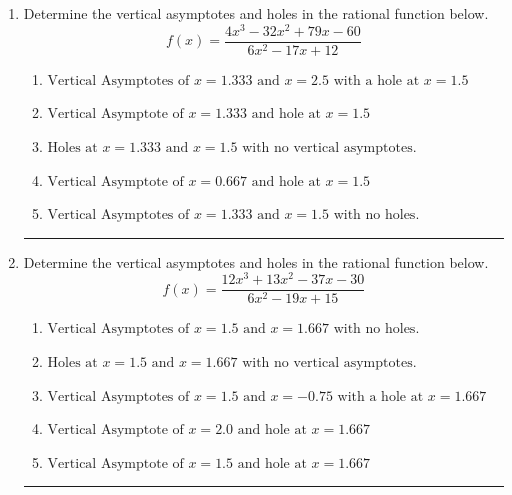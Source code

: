 \documentclass[14pt]{extbook}
\newcommand{\litem}[1]{\item#1\hspace*{-1cm}\rule{\textwidth}{0.4pt}}
\begin{document}
\begin{enumerate}
{\begin{enumerate}[label=\Alph*.]
\end{enumerate} }
\litem{
Determine the vertical asymptotes and holes in the rational function below.\[ f(x) = \frac{4x^{3} -32 x^{2} +79 x -60}{6x^{2} -17 x + 12} \]\begin{enumerate}[label=\Alph*.]
\item \( \text{Vertical Asymptotes of } x = 1.333 \text{ and } x = 2.5 \text{ with a hole at } x = 1.5 \)
\item \( \text{Vertical Asymptote of } x = 1.333 \text{ and hole at } x = 1.5 \)
\item \( \text{Holes at } x = 1.333 \text{ and } x = 1.5 \text{ with no vertical asymptotes.} \)
\item \( \text{Vertical Asymptote of } x = 0.667 \text{ and hole at } x = 1.5 \)
\item \( \text{Vertical Asymptotes of } x = 1.333 \text{ and } x = 1.5 \text{ with no holes.} \)

\end{enumerate} }
\litem{
Determine the vertical asymptotes and holes in the rational function below.\[ f(x) = \frac{12x^{3} +13 x^{2} -37 x -30}{6x^{2} -19 x + 15} \]\begin{enumerate}[label=\Alph*.]
\item \( \text{Vertical Asymptotes of } x = 1.5 \text{ and } x = 1.667 \text{ with no holes.} \)
\item \( \text{Holes at } x = 1.5 \text{ and } x = 1.667 \text{ with no vertical asymptotes.} \)
\item \( \text{Vertical Asymptotes of } x = 1.5 \text{ and } x = -0.75 \text{ with a hole at } x = 1.667 \)
\item \( \text{Vertical Asymptote of } x = 2.0 \text{ and hole at } x = 1.667 \)
\item \( \text{Vertical Asymptote of } x = 1.5 \text{ and hole at } x = 1.667 \)


\end{enumerate}}
\end{enumerate}
\end{document}

